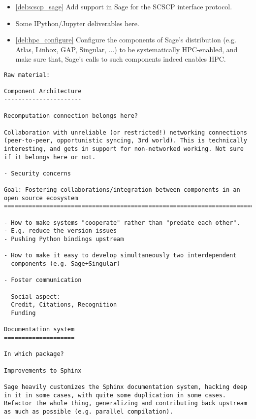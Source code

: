\begin{Workpackage}{\thewpno}
\begin{WPDeliverables}
\begin{itemize}
\item \ref{del:scscp_sage} Add support in Sage for the SCSCP interface
  protocol.
\item Some IPython/Jupyter deliverables here.
\item \ref{del:hpc_configure} Configure the components of Sage's
  distribution (e.g. Atlas, Linbox, GAP, Singular, ...) to be
  systematically HPC-enabled, and make sure that, Sage's calls to such
  components indeed enables HPC.
\end{itemize}
\end{WPDeliverables}
\begin{verbatim}
Raw material:

Component Architecture
----------------------

Recomputation connection belongs here?

Collaboration with unreliable (or restricted!) networking connections
(peer-to-peer, opportunistic syncing, 3rd world). This is technically
interesting, and gets in support for non-networked working. Not sure
if it belongs here or not.

- Security concerns

Goal: Fostering collaborations/integration between components in an open source ecosystem
=============================================================================

- How to make systems "cooperate" rather than "predate each other".
- E.g. reduce the version issues
- Pushing Python bindings upstream

- How to make it easy to develop simultaneously two interdependent
  components (e.g. Sage+Singular)

- Foster communication

- Social aspect:
  Credit, Citations, Recognition
  Funding

Documentation system
====================

In which package?

Improvements to Sphinx

Sage heavily customizes the Sphinx documentation system, hacking deep
in it in some cases, with quite some duplication in some cases.
Refactor the whole thing, generalizing and contributing back upstream
as much as possible (e.g. parallel compilation).
\end{verbatim}

\end{Workpackage}
